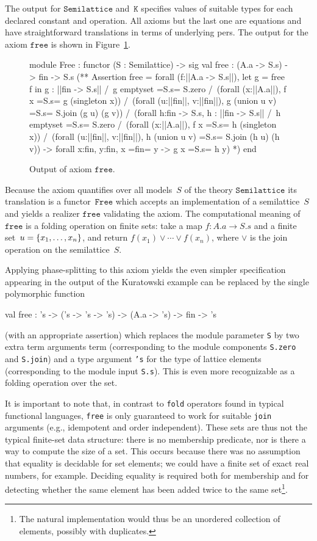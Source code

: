 The output for $\mathtt{Semilattice}$ and~$\mathtt{K}$ specifies
values of suitable types for each declared constant and operation. All
axioms but the last one are equations and have straightforward
translations in terms of underlying pers. The output for the axiom
$\mathtt{free}$ is shown in Figure~\ref{fig:free}.
%
\begin{figure}
  \centering
\begin{source}
module Free : functor (S : Semilattice) ->
sig
val free : (A.a -> S.s) -> fin -> S.s
(**  Assertion free = 
forall (f:||A.a -> S.s||), 
  let g = free f in g : ||fin -> S.s|| /\ 
  g emptyset =S.s= S.zero /\ 
  (forall (x:||A.a||),  f x =S.s= g (singleton x)) /\ 
  (forall (u:||fin||, v:||fin||), g (union u v) =S.s= S.join (g u) (g v)) /\ 
  (forall h:fin -> S.s,  h : ||fin -> S.s|| /\ 
     h emptyset =S.s= S.zero /\ 
     (forall (x:||A.a||), f x =S.s= h (singleton x)) /\ 
     (forall (u:||fin||, v:||fin||), 
        h (union u v) =S.s= S.join (h u) (h v)) ->
     forall x:fin, y:fin,  x =fin= y -> g x =S.s= h y)
*)
end
\end{source}
  \caption{Output of axiom $\texttt{free}$.}
  \label{fig:free}
\end{figure}
%
Because the axiom quantifies over all models~$S$ of the theory
$\mathtt{Semilattice}$ its translation is a functor~$\mathtt{Free}$
which accepts an implementation of a semilattice~$S$ and yields a
realizer $\mathtt{free}$ validating the axiom. The computational
meaning of $\mathtt{free}$ is a folding operation on finite sets: take
a map $f : A.a \to S.s$ and a finite set~$u = \{x_1, \ldots, x_n\}$,
and return $f(x_1) \vee \cdots \vee f(x_n)$, where $\vee$ is the join
operation on the semilattice~$S$.

Applying phase-splitting to this axiom yields the even simpler
specification
appearing in the output of the Kuratowski example can be replaced by the single polymorphic function
\begin{source}
val free : 's -> ('s -> 's -> 's) -> (A.a -> 's) -> fin -> 's	
\end{source}
(with an appropriate assertion)
which replaces the module parameter \texttt{S} by two extra term arguments term (corresponding to the module components \texttt{S.zero} and \texttt{S.join}) 
and a type argument \texttt{'s} for the type of lattice elements (corresponding to the module input \texttt{S.s}).  This is even
more recognizable as a folding operation over the set.


It is important to note that, in contrast to \texttt{fold} operators found in typical functional
languages, \texttt{free} is only guaranteed to work for suitable \texttt{join} arguments (e.g., idempotent and order independent).  These
sets are thus not the typical finite-set data structure: there is no membership predicate, nor
is there a way to compute the size of a set.  This occurs because there was no
assumption that equality is decidable for set elements; we could have a finite set
of exact real numbers, for example.  Deciding equality
is required both for membership and for detecting
whether the same element has been added twice to the same set\footnote{The natural implementation would thus
be an unordered collection of elements, possibly with duplicates.}.

